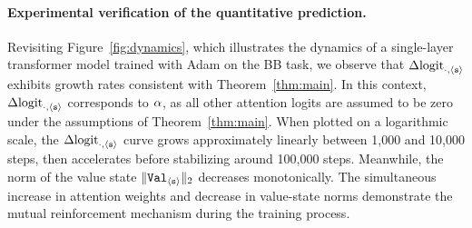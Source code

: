 





\paragraph{Experimental verification of the quantitative prediction.} Revisiting Figure~\ref{fig:dynamics}, which illustrates the dynamics of a single-layer transformer model trained with Adam on the BB task, we observe that $\Delta\text{logit}_{\cdot,\texttt{$\langle \texttt{s}\rangle$}}$ exhibits growth rates consistent with Theorem~\ref{thm:main}. In this context, $\Delta\text{logit}_{\cdot,\texttt{$\langle \texttt{s}\rangle$}}$  corresponds to $\alpha$, as all other attention logits are assumed to be zero under the assumptions of Theorem~\ref{thm:main}. When plotted on a logarithmic scale, the $\Delta\text{logit}_{\cdot,\texttt{$\langle \texttt{s}\rangle$}}$ curve grows approximately linearly between 1,000 and 10,000 steps, then accelerates before stabilizing around 100,000 steps.  Meanwhile, the norm of the value state $\|{\tt Val}_{\texttt{$\langle \texttt{s}\rangle$}}\|_2$ decreases monotonically. The simultaneous increase in attention weights and decrease in value-state norms demonstrate the mutual reinforcement mechanism during the training process. 

